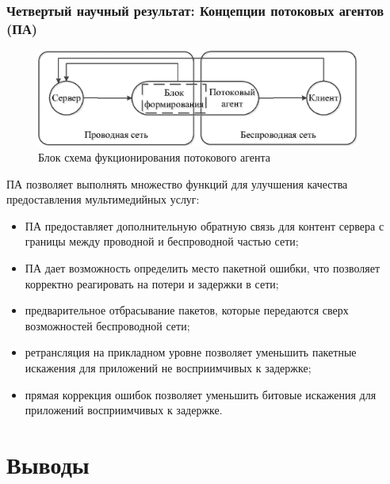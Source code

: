 \documentclass[10pt,pdf,hyperref={unicode}]{beamer}
\begin{document}
\begin{frame}
\frametitle{Четвертый научный результат: Концепции потоковых агентов (ПА)}

\begin{figure} [h]
  \center
\includegraphics [width=0.95\textwidth] {SA.eps}
  \caption*{Блок схема фукционирования потокового агента}
  \label{img:SA}
\end{figure}

\begin{scriptsize}
ПА позволяет выполнять множество функций для улучшения качества предоставления мультимедийных услуг:
\begin{itemize}
\item ПА предоставляет дополнительную обратную связь для контент сервера с границы между проводной  и беспроводной частью сети;
\item ПА дает возможность определить место пакетной ошибки, что позволяет корректно реагировать на потери и задержки в сети;
\item предварительное отбрасывание пакетов, которые передаются сверх возможностей беспроводной сети;
\item ретрансляция на прикладном уровне позволяет уменьшить  пакетные искажения  для приложений не восприимчивых к задержке;
\item прямая коррекция ошибок позволяет уменьшить битовые искажения для приложений восприимчивых к задержке.
\end{itemize}
\end{scriptsize}
\end{frame}

\section{Выводы}
\end{document}
